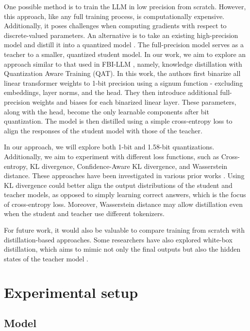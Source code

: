 \documentclass{article}
\begin{document}
One possible method is to train the LLM in low precision from scratch. However, this approach, like any full training process, is
computationally expensive. Additionally, it poses challenges when computing gradients with respect to discrete-valued parameters.
An alternative is to take an existing high-precision model and distill it into a quantized model
\cite{du2024bitdistillerunleashingpotentialsub4bit}. The full-precision model serves as a teacher to a smaller, quantized student model. 
In our work, we aim to explore an approach similar to that used in FBI-LLM \cite{fbillm}, namely, knowledge distillation with Quantization Aware Training (QAT). In this work, the authors first binarize all 
linear transformer weights to 1-bit precision using a signum function - excluding embeddings, layer norms, and the head. They then introduce additional 
full-precision weights and biases for each binarized linear layer. These parameters, along with the head, become the only learnable 
components after bit quantization. The model is then distilled using a simple cross-entropy loss to align the responses of the student 
model with those of the teacher.

In our approach, we will explore both 1-bit and 1.58-bit quantizations. Additionally, we aim to experiment with different loss 
functions, such as Cross-entropy, KL divergence, Confidence-Aware KL divergence, and Wasserstein distance. These approaches have been investigated in various
prior works \cite{du2024bitdistillerunleashingpotentialsub4bit, boizard2025crosstokenizerdistillationuniversallogit}. Using KL divergence 
could better align the output distributions of the student and teacher models, as opposed to simply learning correct answers, which is 
the focus of cross-entropy loss. Moreover, Wasserstein distance may allow distillation even when the student and teacher use different tokenizers.

For future work, it would also be valuable to compare training from scratch with distillation-based approaches. Some researchers 
have also explored white-box distillation, which aims to mimic not only the final outputs but also the hidden states of the teacher 
model \cite{gu2024minillmknowledgedistillationlarge}.

\section{Experimental setup}

\subsection{Model}
\end{document}
